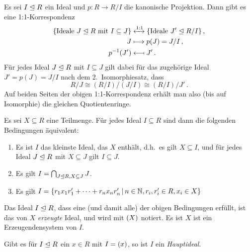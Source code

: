 \begin{lemma}
  \label{lemma: correspondence between ideals}
  Es sei $I \mathrel{\trianglelefteq} R$ ein Ideal und $p \colon R \to R/I$ die kanonische Projektion.
  Dann gibt es eine 1:1-Korrespondenz
  \begin{align*}
    \{ \text{Ideale $J \mathrel{\trianglelefteq} R$ mit $I \subseteq J$} \}
    &\xleftrightarrow{1:1}
    \{ \text{Ideale $J' \mathrel{\trianglelefteq} R/I$} \} \,,
    \\
    J
    &\longmapsto
    p(J)
    =
    J/I \,,
    \\
    p^{-1}(J')
    &\longmapsfrom
    J' \,.
  \end{align*}
  Für jedes Ideal $J \mathrel{\trianglelefteq} R$ mit $I \subseteq J$ gilt dabei für das zugehörige Ideal $J' = p(J) = J/I$ nach dem 2.\ Isomorphiesatz, dass
  \[
          R/J
    \cong (R/I)/(J/I)
    \cong (R/I)/J' \,.
  \]
  Auf beiden Seiten der obigen 1:1-Korrespondenz erhält man also \textup(bis auf Isomorphie\textup) die gleichen Quotientenringe.
\end{lemma}

Es sei $X \subseteq R$ eine Teilmenge.
Für jedes Ideal $I \subseteq R$ sind dann die folgenden Bedingungen äquivalent:

\begin{enumerate}
  \item
    Es ist $I$ das kleinste Ideal, das $X$ enthält, d.h.\ es gilt $X \subseteq I$, und für jedes Ideal $J \mathrel{\trianglelefteq} R$ mit $X \subseteq J$ gilt $I \subseteq J$.
  \item
    Es gilt $I = \bigcap_{J \mathrel{\trianglelefteq} R, X \subseteq J} J$.
  \item
    Es gilt
    $
        I
      = \{
          r_1 x_1 r'_1 + \dotsb + r_n x_n r'_n
        \suchthat
          n \in \Natural,
          r_i, r'_i \in R,
          x_i \in X
        \}
    $
\end{enumerate}

\begin{definition}
  Das Ideal $I \mathrel{\trianglelefteq} R$, dass eine \textup(und damit alle\textup) der obigen Bedingungen erfüllt, ist das von $X$ \emph{erzeugte} Ideal, und wird mit $(X)$ notiert.
  Es ist $X$ ist ein Erzeugendensystem von $I$.
\end{definition}

\begin{definition}
  Gibt es für $I \mathrel{\trianglelefteq} R$ ein $x \in R$ mit $I = (x)$, so ist $I$ ein \emph{Hauptideal}.
\end{definition}





